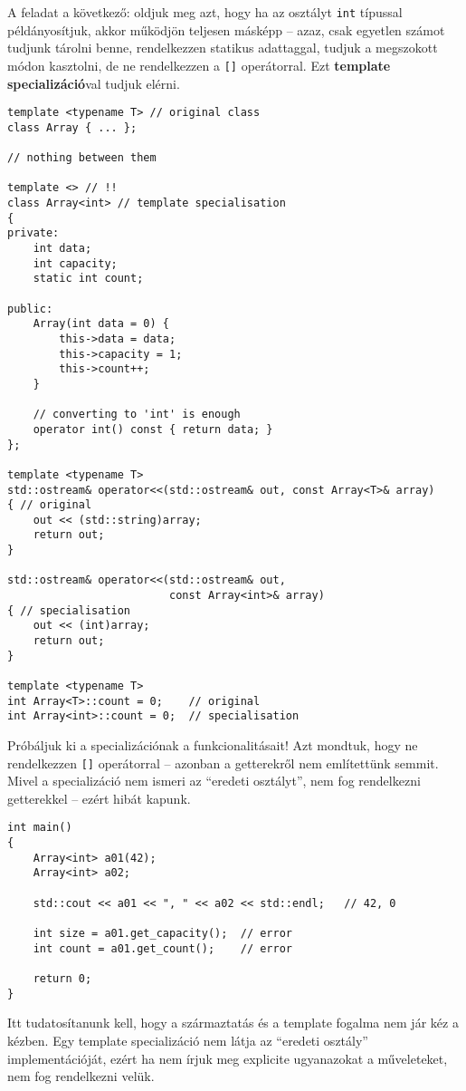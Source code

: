 \documentclass[a4paper, 11pt, oneside]{book}
\begin{document}
A feladat a következő: oldjuk meg azt, hogy ha az osztályt \verb*|int| típussal példányosítjuk, akkor működjön teljesen másképp -- azaz, csak egyetlen számot tudjunk tárolni benne, rendelkezzen statikus adattaggal, tudjuk a megszokott módon kasztolni, de ne rendelkezzen a \verb*|[]| operátorral. Ezt \textbf{template specializáció}val tudjuk elérni.

\begin{lstlisting}[style=cppstyle]
template <typename T> // original class
class Array { ... };

// nothing between them

template <> // !!
class Array<int> // template specialisation
{
private:
	int data;
	int capacity;
	static int count;
	
public:
	Array(int data = 0) {
		this->data = data;
		this->capacity = 1;
		this->count++;
	}
	
	// converting to 'int' is enough
	operator int() const { return data; }
};

template <typename T>
std::ostream& operator<<(std::ostream& out, const Array<T>& array) 
{ // original 
	out << (std::string)array;
	return out;
}

std::ostream& operator<<(std::ostream& out, 
                         const Array<int>& array) 
{ // specialisation
	out << (int)array;
	return out;
}

template <typename T>
int Array<T>::count = 0;	// original
int Array<int>::count = 0;	// specialisation
\end{lstlisting}

Próbáljuk ki a specializációnak a funkcionalitásait! Azt mondtuk, hogy ne rendelkezzen \verb*|[]| operátorral -- azonban a getterekről nem említettünk semmit. Mivel a specializáció nem ismeri az ``eredeti osztályt'', nem fog rendelkezni getterekkel -- ezért hibát kapunk.

\begin{lstlisting}[style=cppstyle]
int main() 
{
	Array<int> a01(42);
	Array<int> a02;
	
	std::cout << a01 << ", " << a02 << std::endl;	// 42, 0
	
	int size = a01.get_capacity();	// error
	int count = a01.get_count();	// error
	
	return 0;
}
\end{lstlisting}

Itt tudatosítanunk kell, hogy a származtatás és a template fogalma nem jár kéz a kézben. Egy template specializáció nem látja az ``eredeti osztály'' implementációját, ezért ha nem írjuk meg explicite ugyanazokat a műveleteket, nem fog rendelkezni velük.
\end{document}
